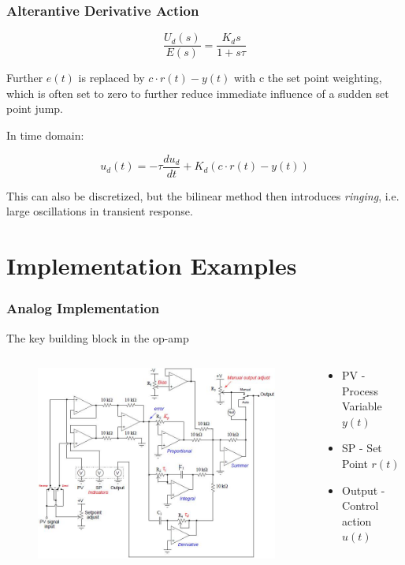 \begin{frame}
	\frametitle{Alterantive Derivative Action}
	\begin{equation*}
		\frac{U_d(s)}{E(s)} = \frac{K_d s}{1+s\tau}
	\end{equation*}
	
	Further $e(t)$ is replaced by $c\cdot r(t)-y(t)$ with c the set point weighting, which is often set to zero to further reduce immediate influence of a sudden set point jump. 
	
	In time domain:
	
	\begin{equation*}
		u_d(t) = -\tau\frac{du_d}{dt} + K_d(c\cdot r(t)-y(t))
	\end{equation*}
	
	This can also be discretized, but the bilinear method then introduces \emph{ringing}, i.e. large oscillations in transient response.
\end{frame}
\section{Implementation Examples}

\begin{frame}
	\frametitle{Analog Implementation}
	The key building block in the op-amp
	\begin{columns}
		\begin{column}{0.6\linewidth}
			\begin{figure}
				\centering
				\includegraphics[width=1.1\linewidth]{img/Principles_of_Feedback_Control_Fig_079}
			\end{figure}
		\end{column}
		\begin{column}{0.5\linewidth}
			\begin{itemize}
				\item PV - Process Variable $y(t)$
				\item SP - Set Point $r(t)$
				\item Output - Control action $u(t)$
			\end{itemize}
		\end{column}
	\end{columns}
\end{frame}

